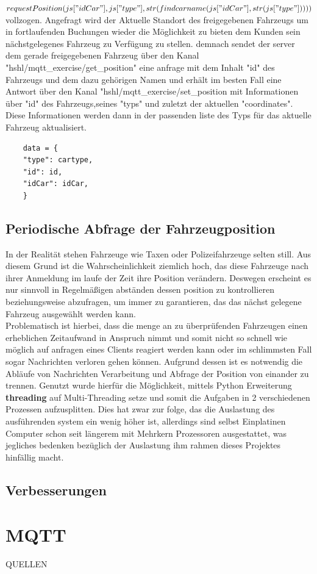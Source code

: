 \documentclass[conference]{IEEEtran}
\begin{document}
\textit{$requestPosition(js["idCar"],js["type"],\\str(findcarname(js["idCar"],str(js["type"]))))$}
vollzogen.  Angefragt wird der Aktuelle Standort des freigegebenen Fahrzeugs um in fortlaufenden Buchungen wieder die Möglichkeit zu bieten dem Kunden sein nächstgelegenes Fahrzeug zu Verfügung zu stellen. demnach sendet der server dem gerade freigegebenen Fahrzeug über den Kanal \textsf{"hshl/mqtt\_exercise/get\_position"} eine anfrage mit dem Inhalt "id" des Fahrzeugs und dem dazu gehörigen Namen und erhält im besten Fall  eine Antwort über den Kanal  \textsf{"hshl/mqtt\_exercise/set\_position} mit Informationen über "id" des Fahrzeugs,seines "typs" und zuletzt der aktuellen "coordinates". Diese Informationen werden dann in der passenden liste des Typs für das aktuelle Fahrzeug aktualisiert.
\begin{lstlisting}
    data = {
    "type": cartype,
    "id": id,
    "idCar": idCar,
    }
\end{lstlisting}
\subsection{Periodische Abfrage der Fahrzeugposition}
In der Realität stehen Fahrzeuge wie Taxen oder Polizeifahrzeuge selten still. Aus diesem Grund ist die Wahrscheinlichkeit ziemlich hoch, das diese Fahrzeuge nach ihrer Anmeldung im laufe der Zeit ihre Position verändern. Deswegen erscheint es nur sinnvoll in Regelmäßigen abständen dessen position zu kontrollieren beziehungsweise abzufragen, um immer zu garantieren, das das nächst gelegene Fahrzeug ausgewählt werden kann.\\ Problematisch ist hierbei, dass die menge an zu überprüfenden Fahrzeugen einen erheblichen Zeitaufwand in Anspruch nimmt und somit nicht so schnell wie möglich auf anfragen eines Clients reagiert werden kann oder im schlimmsten Fall sogar Nachrichten verloren gehen können. Aufgrund dessen ist es notwendig die Abläufe von Nachrichten Verarbeitung und Abfrage der Position von einander zu trennen. Genutzt wurde hierfür die Möglichkeit, mittels Python Erweiterung \textbf{threading} auf Multi-Threading setze und somit die Aufgaben in 2 verschiedenen Prozessen aufzusplitten. Dies hat zwar zur folge, das die Auslastung des ausführenden system ein wenig höher ist, allerdings sind selbst Einplatinen Computer schon seit längerem mit Mehrkern Prozessoren ausgestattet, was jegliches bedenken bezüglich der Auslastung ihm rahmen dieses Projektes hinfällig macht.
\subsection{Verbesserungen}
\section{MQTT}

\begin{thebibliography}{00}
 QUELLEN  
\end{thebibliography}
\vspace{12pt}
\end{document}

